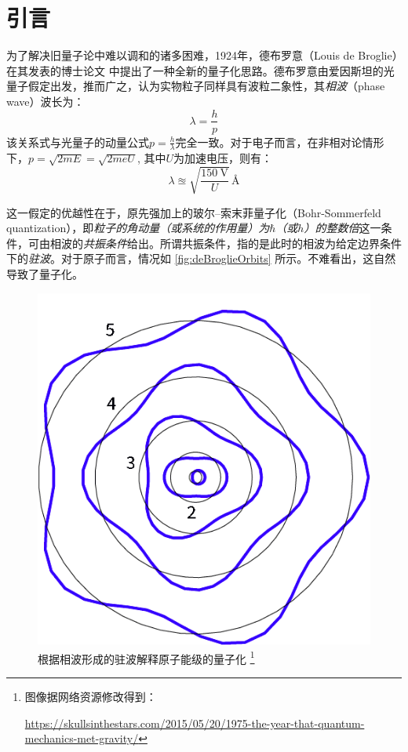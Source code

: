 \documentclass[aps,pre,12pt,preprint,%
	onecolumn,showpacs,showkeys,nofootinbib]{revtex4-2}
\begin{document}
\section{引言}
	为了解决旧量子论中难以调和的诸多困难，1924年，德布罗意（Louis de Broglie）在其发表的博士论文 \cite{de1924recherches} 中提出了一种全新的量子化思路。德布罗意由爱因斯坦的光量子假定出发，推而广之，认为实物粒子同样具有波粒二象性，其\textit{相波}（phase wave）波长为：
	\begin{equation}
		\lambda = \frac{h}{p}
	\end{equation}
	该关系式与光量子的动量公式$p = \frac{h}{\lambda}$完全一致。对于电子而言，在非相对论情形下，$p = \sqrt{2mE} = \sqrt{2meU}$, 其中$U$为加速电压，则有：
	\begin{equation}
		\lambda \approxeq \sqrt{\frac{\SI{150}{\V}}{U}}\,\si{\angstrom}
		\label{eq:deBroglieLambda}
	\end{equation}
	
	这一假定的优越性在于，原先强加上的玻尔--索末菲量子化（Bohr-Sommerfeld quantization），即\textit{粒子的角动量（或系统的作用量）为$\hbar$（或$h$）的整数倍}这一条件，可由相波的\textit{共振条件}给出。所谓共振条件，指的是此时的相波为给定边界条件下的\textit{驻波}。对于原子而言，情况如 \autoref{fig:deBroglieOrbits} 所示。不难看出，这自然导致了量子化。
	\begin{figure}[!ht]
	\centering
	\includegraphics[width=.35\linewidth]{deBroglieOrbits.png}
	\caption[根据相波形成的驻波解释原子能级的量子化]{%
		根据相波形成的驻波解释原子能级的量子化%
		\vspace{3ex}
		\footnote{%
			图像据网络资源修改得到：\par
			\noindent\fontsize{9pt}{\parskip}%
			\url{https://skullsinthestars.com/2015/05/20/1975-the-year-that-quantum-mechanics-met-gravity/}}%
		}
	\label{fig:deBroglieOrbits}
	\end{figure}
	
\end{document}
